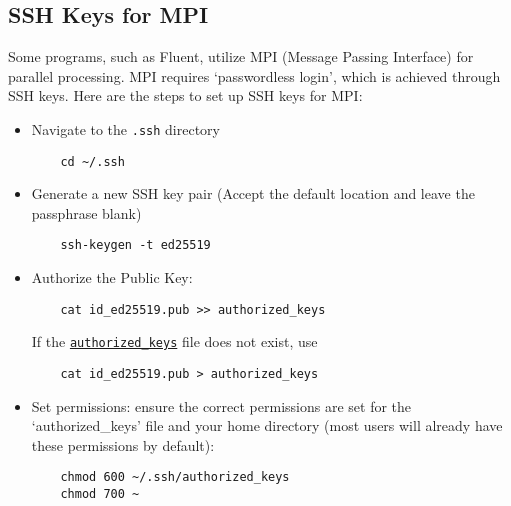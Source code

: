 \subsection{SSH Keys for MPI}
\label{sect:ssh-mpi}

Some programs, such as Fluent, utilize MPI (Message Passing Interface) for parallel processing.
MPI requires `passwordless login', which is achieved through SSH keys.
Here are the steps to set up SSH keys for MPI:

\begin{itemize}
	\item Navigate to the \texttt{.ssh} directory
	\begin{verbatim}
	cd ~/.ssh
	\end{verbatim}

	\item Generate a new SSH key pair (Accept the default location and leave the passphrase blank)
	\begin{verbatim}
	ssh-keygen -t ed25519
	\end{verbatim}

	\item Authorize the Public Key:
	\begin{verbatim}
	cat id_ed25519.pub >> authorized_keys
	\end{verbatim}
	If the \texttt{\href{https://www.ssh.com/academy/ssh/authorized-keys-file}{authorized\_keys}} file does not exist, use
	\begin{verbatim}
	cat id_ed25519.pub > authorized_keys
	\end{verbatim}

	\item Set permissions: ensure the correct permissions are set for the `authorized\_keys' file and your home directory
	(most users will already have these permissions by default):
	\begin{verbatim}
	chmod 600 ~/.ssh/authorized_keys
	chmod 700 ~
	\end{verbatim}
\end{itemize}